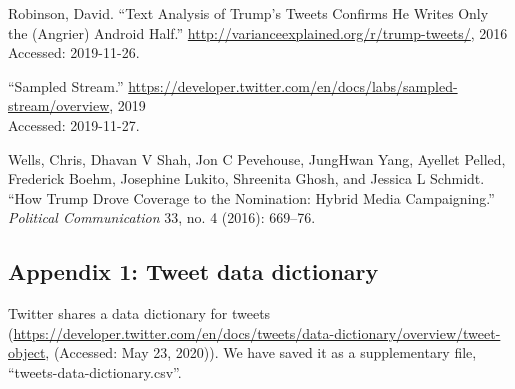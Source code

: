 \documentclass[
]{article}
\begin{document}
\leavevmode\hypertarget{ref-drob}{}%
Robinson, David. ``Text Analysis of Trump's Tweets Confirms He Writes
Only the (Angrier) Android Half.''
\url{http://varianceexplained.org/r/trump-tweets/}, 2016\\
Accessed: 2019-11-26.

\leavevmode\hypertarget{ref-tweet_stream}{}%
``Sampled Stream.''
\url{https://developer.twitter.com/en/docs/labs/sampled-stream/overview},
2019\\
Accessed: 2019-11-27.

\leavevmode\hypertarget{ref-wells2016trump}{}%
Wells, Chris, Dhavan V Shah, Jon C Pevehouse, JungHwan Yang, Ayellet
Pelled, Frederick Boehm, Josephine Lukito, Shreenita Ghosh, and Jessica
L Schmidt. ``How Trump Drove Coverage to the Nomination: Hybrid Media
Campaigning.'' \emph{Political Communication} 33, no. 4 (2016): 669--76.

\newpage

\hypertarget{appendix-1-tweet-data-dictionary}{%
\subsection{Appendix 1: Tweet data
dictionary}\label{appendix-1-tweet-data-dictionary}}

Twitter shares a data dictionary for tweets
(\url{https://developer.twitter.com/en/docs/tweets/data-dictionary/overview/tweet-object},
(Accessed: May 23, 2020)). We have saved it as a supplementary file,
``tweets-data-dictionary.csv''.
\end{document}
